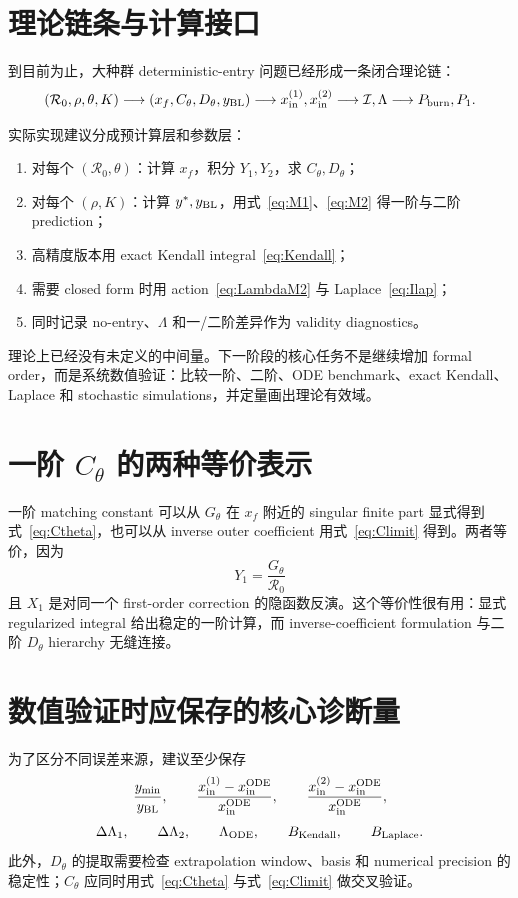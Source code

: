 \documentclass[11pt,a4paper]{ctexart}
\newcommand{\Rzero}{\mathcal R_0}
\newcommand{\BL}{y_{\rm BL}}
\newcommand{\xf}{x_f}
\newcommand{\Pone}{P_1}
\newcommand{\Pburn}{P_{\rm burn}}
\begin{document}
\section{理论链条与计算接口}
到目前为止，大种群 deterministic-entry 问题已经形成一条闭合理论链：
\[
(\Rzero,\rho,\theta,K)
\longrightarrow
(\xf,C_\theta,D_\theta,\BL)
\longrightarrow
x_{\rm in}^{(1)},x_{\rm in}^{(2)}
\longrightarrow
\mathcal I,\Lambda
\longrightarrow
\Pburn,\Pone.
\]

实际实现建议分成预计算层和参数层：
\begin{enumerate}[leftmargin=2.2em]
\item 对每个 $(\Rzero,\theta)$：计算 $\xf$，积分 $Y_1,Y_2$，求 $C_\theta,D_\theta$；
\item 对每个 $(\rho,K)$：计算 $y^*,\BL$，用式~\eqref{eq:M1}、\eqref{eq:M2} 得一阶与二阶 prediction；
\item 高精度版本用 exact Kendall integral~\eqref{eq:Kendall}；
\item 需要 closed form 时用 action~\eqref{eq:LambdaM2} 与 Laplace~\eqref{eq:Ilap}；
\item 同时记录 no-entry、$\Lambda$ 和一/二阶差异作为 validity diagnostics。
\end{enumerate}

理论上已经没有未定义的中间量。下一阶段的核心任务不是继续增加 formal order，而是系统数值验证：比较一阶、二阶、ODE benchmark、exact Kendall、Laplace 和 stochastic simulations，并定量画出理论有效域。

\appendix
\section{一阶 $C_\theta$ 的两种等价表示}
一阶 matching constant 可以从 $G_\theta$ 在 $x_f$ 附近的 singular finite part 显式得到式~\eqref{eq:Ctheta}，也可以从 inverse outer coefficient 用式~\eqref{eq:Climit} 得到。两者等价，因为
\[
Y_1=\frac{G_\theta}{\Rzero}
\]
且 $X_1$ 是对同一个 first-order correction 的隐函数反演。这个等价性很有用：显式 regularized integral 给出稳定的一阶计算，而 inverse-coefficient formulation 与二阶 $D_\theta$ hierarchy 无缝连接。

\section{数值验证时应保存的核心诊断量}
为了区分不同误差来源，建议至少保存
\[
\frac{y_{\min}}{\BL},
\qquad
\frac{x_{\rm in}^{(1)}-x_{\rm in}^{\rm ODE}}{x_{\rm in}^{\rm ODE}},
\qquad
\frac{x_{\rm in}^{(2)}-x_{\rm in}^{\rm ODE}}{x_{\rm in}^{\rm ODE}},
\]
\[
\Delta\Lambda_1,
\qquad
\Delta\Lambda_2,
\qquad
\Lambda_{\rm ODE},
\qquad
B_{\rm Kendall},
\qquad
B_{\rm Laplace}.
\]
此外，$D_\theta$ 的提取需要检查 extrapolation window、basis 和 numerical precision 的稳定性；$C_\theta$ 应同时用式~\eqref{eq:Ctheta} 与式~\eqref{eq:Climit} 做交叉验证。
\end{document}
